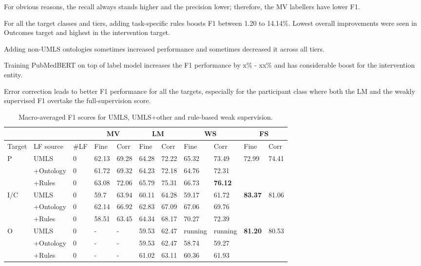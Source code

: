 \documentclass[10.7pt,]{article}
\begin{document}
For obvious reasons, the recall always stands higher and the precision lower; therefore, the MV labellers have lower F1.


For all the target classes and tiers, adding task-specific rules boosts F1 between 1.20 to 14.14\%.
Lowest overall improvements were seen in Outcomes target and highest in the intervention target.


Adding non-UMLS ontologies sometimes increased performance and sometimes decreased it across all tiers.


Training PubMedBERT on top of label model increases the F1 performance by x\% - xx\% and has considerable boost for the intervention entity.


Error correction leads to better F1 performance for all the targets, especially for the participant class where both the LM and the weakly supervised F1 overtake the full-supervision score. 


\begin{table}[!ht]
    \centering
    \begin{tabular}{|l|l|l|l|l|l|l|l|l|l|l|}
        \hline
        \multicolumn{3}{|c|}{} &
        \multicolumn{2}{|c|}{MV} & \multicolumn{2}{|c|}{LM} & \multicolumn{2}{|c|}{WS} & \multicolumn{2}{|c|}{FS} \\
        \hline
        Target & LF source & \#LF & Fine & Corr & Fine & Corr & Fine & Corr & Fine & Corr \\
        \hline
        P & UMLS & 0 & 62.13 & 69.28 & 64.28 & 72.22 & 65.32 & 73.49 & 72.99 & 74.41 \\ 
        ~ & +Ontology & 0 & 61.72 & 69.32 & 64.23 & 72.18 & 64.76 & 72.31 & ~ & ~ \\ 
        ~ & +Rules & 0 & 63.08 & 72.06 & 65.79 & 75.31 & 66.73 & \textbf{76.12} & ~ & ~ \\ \hline
        I/C & UMLS & 0 &59.7 & 63.94 & 60.11 & 64.28 & 59.17 & 61.72 & \textbf{83.37} & 81.06 \\ 
        ~ & +Ontology & 0 & 62.14 & 66.92 & 62.83 & 67.09 & 67.06 & 69.76 & ~ & ~ \\ 
        ~ & +Rules & 0 & 58.51 & 63.45 & 64.34 & 68.17 & 70.27 & 72.39 & ~ & ~ \\  \hline
        O & UMLS & 0 & - & - & 59.53 & 62.47 & running & running & \textbf{81.20} & 80.53 \\ 
        ~ & +Ontology & 0 & - & - & 59.53 & 62.47 & 58.74 & 59.27 & ~ & ~ \\ 
        ~ & +Rules & 0 & - & - & 61.02 & 63.11 & 60.36 & 61.93 & ~ & ~ \\ \hline
    \end{tabular}
    \caption{\label{tab:res} Macro-averaged F1 scores for UMLS, UMLS+other and rule-based weak supervision.}
\end{table}
\end{document}
